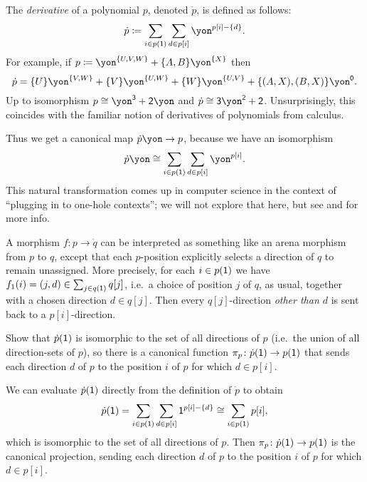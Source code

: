 \documentclass[Book-Poly]{subfiles}
\begin{document}
\begin{example}[Derivatives]\label{ex.derivatives}
The \emph{derivative} of a polynomial $p$, denoted $\dot{p}$, is defined as follows:
\[
\dot{p}\coloneqq\sum_{i\in p(\1)}\sum_{d\in p[i]}\yon^{p[i]-\{d\}}.
\]
For example, if $p\coloneq\yon^{\{U,V,W\}}+\{A,B\}\yon^{\{X\}}$ then 
\[\dot{p}=\{U\}\yon^{\{V,W\}}+\{V\}\yon^{\{U,W\}}+\{W\}\yon^{\{U,V\}}+\{(A,X),(B,X)\}\yon^\0.\]
Up to isomorphism $p\cong\yon^\3+\2\yon$ and $\dot{p}\cong\3\yon^\2+\2$.
Unsurprisingly, this coincides with the familiar notion of derivatives of polynomials from calculus.

Thus we get a canonical map $\dot{p}\yon\to p$, because we have an isomorphism
\[
\dot{p}\yon\cong\sum_{i\in p(\1)}\sum_{d\in p[i]}\yon^{p[i]}.
\]
This natural transformation comes up in computer science in the context of ``plugging in to one-hole contexts''; we will not explore that here, but see \cite{mcbride} and \cite{abbot2003derivatives} for more info.%

A morphism $f\colon p\to \dot{q}$ can be interpreted as something like an arena morphism from $p$ to $q$, except that each $p$-position explicitly selects a direction of $q$ to remain unassigned. More precisely, for each $i\in p(\textsf{1})$ we have $f_1(i)=(j,d)\in \sum_{j\in q(\textsf{1})}q[j]$, i.e.\ a choice of position $j$ of $q$, as usual, together with a chosen direction $d\in q[j]$. Then every $q[j]$-direction \emph{other than $d$} is sent back to a $p[i]$-direction.
\end{example}

\begin{exercise} \label{exc.deriv_directions}
Show that $\dot{p}(\textsf{1})$ is isomorphic to the set of all directions of $p$ (i.e.\ the union of all direction-sets of $p$), so there is a canonical function $\pi_p \colon \dot{p}(\textsf{1}) \to p(\textsf{1})$ that sends each direction $d$ of $p$ to the position $i$ of $p$ for which $d \in p[i]$.
\begin{solution}
We can evaluate $\dot{p}(\textsf{1})$ directly from the definition of $\dot{p}$ to obtain
\[
    \dot{p}(\textsf{1}) = \sum_{i \in p(\textsf{1})} \sum_{d \in p[i]} \textsf{1}^{p[i]-\{d\}} \cong \sum_{i \in p(\textsf{1})} p[i],
\]
which is isomorphic to the set of all directions of $p$.
Then $\pi_p \colon \dot{p}(\textsf{1}) \to p(\textsf{1})$ is the canonical projection, sending each direction $d$ of $p$ to the position $i$ of $p$ for which $d \in p[i]$.
\end{solution}
\end{exercise}
\end{document}
